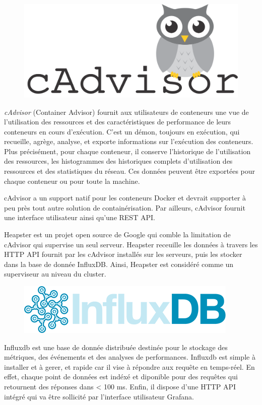 \begin{onehalfspace}
\begin{figure}
\centering
\includegraphics[scale=0.2]{chapitre4/assets/cadvisor}
\end{figure}
\noindent \emph{cAdvisor} (Container Advisor) fournit aux utilisateurs de conteneurs une vue de l'utilisation des ressources et des caractéristiques de performance de leurs conteneurs en cours d'exécution. C'est un démon, toujours en exécution, qui recueille, agrège, analyse, et exporte informations sur l'exécution des conteneurs. Plus précisément, pour chaque conteneur, il conserve l'historique de l'utilisation des ressources, les histogrammes des historiques complets d'utilisation des ressources et des statistiques du réseau. Ces données peuvent être exportées pour chaque conteneur ou pour toute la machine.

cAdvisor a un support natif pour les conteneurs Docker et devrait supporter à peu près tout autre solution de containérisation. Par ailleurs, cAdvisor fournit une interface utilisateur ainsi qu'une REST API.



Heapster est un projet open source de Google qui comble la limitation de cAdvisor qui supervise un seul serveur. Heapster receuille les données à travers les HTTP API fournit par les cAdvisor installés sur les serveurs, puis les stocker dans la base de donnée InfluxDB. Ainsi, Heapster est considéré comme un superviseur au niveau du cluster.


\begin{figure}
\centering
\includegraphics[scale=0.2]{chapitre4/assets/influxdb}
\end{figure}
\noindent Influxdb est une base de donnée distribuée destinée pour le stockage des métriques, des événements et des analyses de performances. Influxdb est simple à installer et à gerer, et rapide car il vise à répondre aux requête en temps-réel. En effet, chaque point de données est indéxé et diponible pour des requêtes qui retournent des réponses dans < 100 ms. Enfin, il dispose d'une HTTP API intégré qui va être sollicité par l'interface utilisateur Grafana.


\end{onehalfspace}
